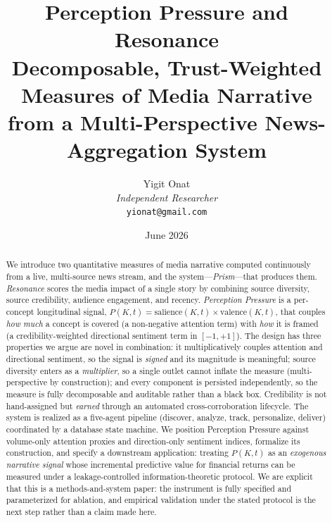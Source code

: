 \documentclass[11pt,a4paper]{article}
\theoremstyle{definition}
\begin{document}
\title{\textbf{Perception Pressure and Resonance}\\[4pt]
\large Decomposable, Trust-Weighted Measures of Media Narrative\\
from a Multi-Perspective News-Aggregation System}

\author{Yigit Onat\\
\textit{Independent Researcher}\\
\texttt{yionat@gmail.com}}
\date{June 2026}
\maketitle

\begin{abstract}
We introduce two quantitative measures of media narrative computed continuously from a live,
multi-source news stream, and the system---\emph{Prism}---that produces them. \emph{Resonance} scores
the media impact of a single story by combining source diversity, source credibility, audience
engagement, and recency. \emph{Perception Pressure} is a per-concept longitudinal signal,
$P(K,t) = \text{salience}(K,t)\times\text{valence}(K,t)$, that couples \emph{how much} a concept is
covered (a non-negative attention term) with \emph{how} it is framed (a credibility-weighted
directional sentiment term in $[-1,+1]$). The design has three properties we argue are novel in
combination: it multiplicatively couples attention and directional sentiment, so the signal is
\emph{signed} and its magnitude is meaningful; source diversity enters as a \emph{multiplier}, so a
single outlet cannot inflate the measure (multi-perspective by construction); and every component is
persisted independently, so the measure is fully decomposable and auditable rather than a black box.
Credibility is not hand-assigned but \emph{earned} through an automated cross-corroboration
lifecycle. The system is realized as a five-agent pipeline (discover, analyze, track, personalize,
deliver) coordinated by a database state machine. We position Perception Pressure against
volume-only attention proxies and direction-only sentiment indices, formalize its construction, and
specify a downstream application: treating $P(K,t)$ as an \emph{exogenous narrative signal} whose
incremental predictive value for financial returns can be measured under a leakage-controlled
information-theoretic protocol. We are explicit that this is a methods-and-system paper: the
instrument is fully specified and parameterized for ablation, and empirical validation under the
stated protocol is the next step rather than a claim made here.
\end{abstract}
\end{document}
